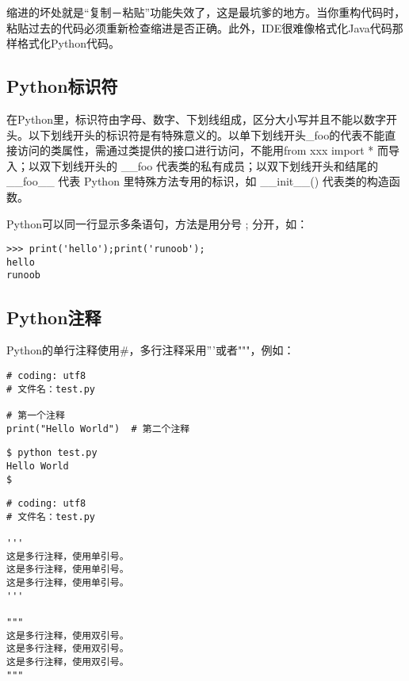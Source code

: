 缩进的坏处就是“复制－粘贴”功能失效了，这是最坑爹的地方。当你重构代码时，粘贴过去的代码必须重新检查缩进是否正确。此外，IDE很难像格式化Java代码那样格式化Python代码。

\subsection{Python标识符}
在Python里，标识符由字母、数字、下划线组成，区分大小写并且不能以数字开头。以下划线开头的标识符是有特殊意义的。以单下划线开头\_foo的代表不能直接访问的类属性，需通过类提供的接口进行访问，不能用from xxx import * 而导入；以双下划线开头的 \_\_foo 代表类的私有成员；以双下划线开头和结尾的 \_\_foo\_\_ 代表 Python 里特殊方法专用的标识，如 \_\_init\_\_() 代表类的构造函数。

Python可以同一行显示多条语句，方法是用分号 ; 分开，如：
\begin{verbatim}
>>> print('hello');print('runoob');
hello
runoob
\end{verbatim}

\subsection{Python注释}
Python的单行注释使用\#，多行注释采用'''或者"""，例如：
\begin{verbatim}
# coding: utf8
# 文件名：test.py

# 第一个注释
print("Hello World")  # 第二个注释
\end{verbatim}

\begin{verbatim}
$ python test.py
Hello World
$ 
\end{verbatim}

\begin{verbatim}
# coding: utf8
# 文件名：test.py

'''
这是多行注释，使用单引号。
这是多行注释，使用单引号。
这是多行注释，使用单引号。
'''

"""
这是多行注释，使用双引号。
这是多行注释，使用双引号。
这是多行注释，使用双引号。
"""
\end{verbatim}

